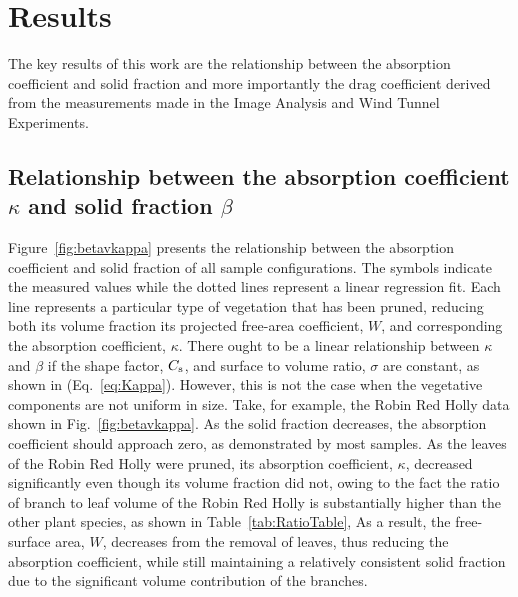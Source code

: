 \documentclass[12pt]{article}
\begin{document}
\pagebreak



\section{Results}
\label{sec:results}

The key results of this work are the relationship between the absorption coefficient and solid fraction and more importantly the drag coefficient derived from the measurements made in the Image Analysis and Wind Tunnel Experiments.

\subsection{Relationship between the absorption coefficient $\kappa$ and solid fraction $\beta$ }

Figure~\ref{fig:betavkappa} presents the relationship between the absorption coefficient and solid fraction of all sample configurations. The symbols indicate the measured values while the dotted lines represent a linear regression fit. Each line represents a particular type of vegetation that has been pruned, reducing both its volume fraction its projected free-area coefficient, $W$, and corresponding the absorption coefficient, $\kappa$. There ought to be a linear relationship between $\kappa$ and $\beta$ if the shape factor, $C_{\rm s}$, and surface to volume ratio, $\sigma$ are constant, as shown in (Eq.~\ref{eq:Kappa}). However, this is not the case when the vegetative components are not uniform in size. Take, for example, the Robin Red Holly data shown in Fig.~\ref{fig:betavkappa}. As the solid fraction decreases, the absorption coefficient should approach zero, as demonstrated by most samples. As the leaves of the Robin Red Holly were pruned, its absorption coefficient, $\kappa$, decreased significantly even though its volume fraction did not, owing to the fact the ratio of branch to leaf volume of the Robin Red Holly is substantially higher than the other plant species, as shown in Table~\ref{tab:RatioTable},  As a result, the free-surface area, $W$, decreases from the removal of leaves, thus reducing the absorption coefficient, while still maintaining a relatively consistent solid fraction due to the significant volume contribution of the branches.
\end{document}
